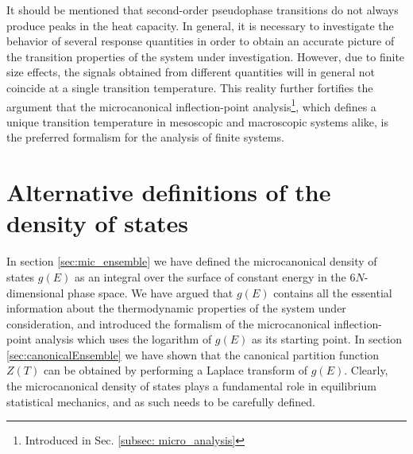 \documentclass[12pt]{report}
\begin{document}
It should be mentioned that second-order pseudophase transitions do not always produce peaks in the heat capacity. In general, it is necessary to investigate the behavior of several response quantities in order to obtain an accurate picture of the transition properties of the system under investigation. However, due to finite size effects, the signals obtained from different quantities will in general not coincide at a single transition temperature. This reality further fortifies the argument that the microcanonical inflection-point analysis\footnote{Introduced in Sec. \ref{subsec: micro_analysis}}, which defines a unique transition temperature in mesoscopic and macroscopic systems alike, is the preferred formalism for the analysis of finite systems.
\newpage


\section{Alternative definitions of the density of states}
In section \ref{sec:mic_ensemble} we have defined the microcanonical density of states $g(E)$ as an integral over the surface of constant energy in the $6N$-dimensional phase space. We have argued that $g(E)$ contains all the essential information about the thermodynamic properties of the system under consideration, and introduced the formalism of the microcanonical inflection-point analysis which uses the logarithm of $g(E)$ as its starting point. In section \ref{sec:canonicalEnsemble} we have shown that the canonical partition function $Z(T)$ can be obtained by performing a Laplace transform of $g(E)$. Clearly, the microcanonical density of states plays a fundamental role in equilibrium statistical mechanics, and as such needs to be carefully defined. 
\end{document}

